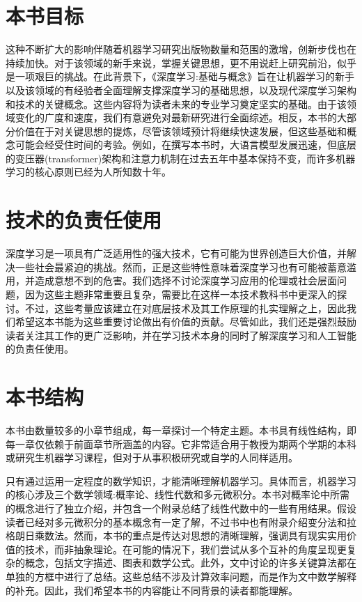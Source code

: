 \documentclass[10pt]{report}
\begin{document}
\section*{本书目标}

这种不断扩大的影响伴随着机器学习研究出版物数量和范围的激增，创新步伐也在持续加快。对于该领域的新手来说，掌握关键思想，更不用说赶上研究前沿，似乎是一项艰巨的挑战。在此背景下，《深度学习:基础与概念》旨在让机器学习的新手以及该领域的有经验者全面理解支撑深度学习的基础思想，以及现代深度学习架构和技术的关键概念。这些内容将为读者未来的专业学习奠定坚实的基础。由于该领域变化的广度和速度，我们有意避免对最新研究进行全面综述。相反，本书的大部分价值在于对关键思想的提炼，尽管该领域预计将继续快速发展，但这些基础和概念可能会经受住时间的考验。例如，在撰写本书时，大语言模型发展迅速，但底层的变压器(transformer)架构和注意力机制在过去五年中基本保持不变，而许多机器学习的核心原则已经为人所知数十年。

\section*{技术的负责任使用}

深度学习是一项具有广泛适用性的强大技术，它有可能为世界创造巨大价值，并解决一些社会最紧迫的挑战。然而，正是这些特性意味着深度学习也有可能被蓄意滥用，并造成意想不到的危害。我们选择不讨论深度学习应用的伦理或社会层面问题，因为这些主题非常重要且复杂，需要比在这样一本技术教科书中更深入的探讨。不过，这些考量应该建立在对底层技术及其工作原理的扎实理解之上，因此我们希望这本书能为这些重要讨论做出有价值的贡献。尽管如此，我们还是强烈鼓励读者关注其工作的更广泛影响，并在学习技术本身的同时了解深度学习和人工智能的负责任使用。

\section*{本书结构}

本书由数量较多的小章节组成，每一章探讨一个特定主题。本书具有线性结构，即每一章仅依赖于前面章节所涵盖的内容。它非常适合用于教授为期两个学期的本科或研究生机器学习课程，但对于从事积极研究或自学的人同样适用。

只有通过运用一定程度的数学知识，才能清晰理解机器学习。具体而言，机器学习的核心涉及三个数学领域:概率论、线性代数和多元微积分。本书对概率论中所需的概念进行了独立介绍，并包含一个附录总结了线性代数中的一些有用结果。假设读者已经对多元微积分的基本概念有一定了解，不过书中也有附录介绍变分法和拉格朗日乘数法。然而，本书的重点是传达对思想的清晰理解，强调具有现实实用价值的技术，而非抽象理论。在可能的情况下，我们尝试从多个互补的角度呈现更复杂的概念，包括文字描述、图表和数学公式。此外，文中讨论的许多关键算法都在单独的方框中进行了总结。这些总结不涉及计算效率问题，而是作为文中数学解释的补充。因此，我们希望本书的内容能让不同背景的读者都能理解。
\end{document}
